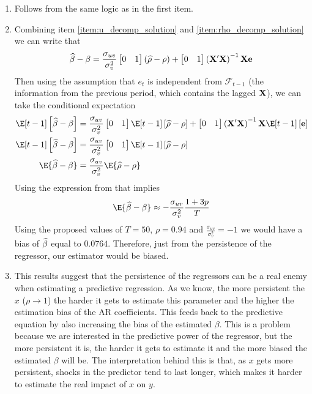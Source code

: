 \begin{solution}
\begin{enumerate}[label = (\alph*)]
    \item\label{item:rho_decomp_solution} Follows from the same logic as in the first item.
    \item Combining item \ref{item:u_decomp_solution} and \ref{item:rho_decomp_solution} we can write that
    \begin{align*}
        \widehat{\beta}-\beta = \frac{\sigma_{uv}}{\sigma_v^2}\begin{bmatrix} 0 & 1\end{bmatrix}\left( \widehat{\rho}-\rho \right)+ \begin{bmatrix}0 & 1 \end{bmatrix} \left( \mathbf{X}^\prime\mathbf{X} \right)^{-1}\mathbf{X} \mathbf{e}
    \end{align*}
    Then using the assumption that \(e_t\) is independent from \(\mathcal{F}_{t-1}\) (the information from the previous period, which contains the lagged \(\mathbf{X}\)), we can take the conditional expectation 
    \begin{align*}
        \E[t-1]\bs{\wh\beta-\beta} & = \frac{\sigma_{uv}}{\sigma_v^2}\begin{bmatrix} 0 & 1\end{bmatrix}\E[t-1]\bs{\wh\rho-\rho} + \begin{bmatrix}0 & 1 \end{bmatrix} \bp{\mb X^\prime\mb X}^{-1}\mb X \E[t-1]\bs{\mb e} \\
        \E[t-1]\bs{\wh\beta-\beta} & = \frac{\sigma_{uv}}{\sigma_v^2}\begin{bmatrix} 0 & 1\end{bmatrix}\E[t-1]\bs{\wh\rho-\rho} \\
        \E{\wh\beta-\beta} & = \frac{\sigma_{uv}}{\sigma_v^2}\E{\wh\rho-\rho}
    \end{align*}
    Using the  expression from \citet{kendall1954note} that implies
    \[
        \E{\wh\beta-\beta}\approx -\frac{\sigma_{uv}}{\sigma_v^2}\frac{1+3p}{T}
    \]
    Using the proposed values of \(T = 50\), \(\rho = 0.94\) and \(\frac{\sigma_{uv}}{\sigma_v^2} = -1\) we would have a bias of \(\widehat{\beta}\) equal to \(0.0764\). Therefore, just from the persistence of the regressor, our estimator would be biased.

    \item This results suggest that the persistence of the regressors can be a real enemy when estimating a predictive regression. As we know, the more persistent the \(x\) (\(\rho \to 1\)) the harder it gets to estimate this parameter and the higher the estimation bias of the AR coefficients. This feeds back to the predictive equation by also increasing the bias of the estimated \(\beta\). This is a problem because we are interested in the predictive power of the regressor, but the more persistent it is, the harder it gets to estimate it and the more biased the estimated \(\beta\) will be. 
    The interpretation behind this is that, as \(x\) gets more persistent, shocks in the predictor tend to last longer, which makes it harder to estimate the real impact of \(x\) on \(y\).


\end{enumerate}
\end{solution}
